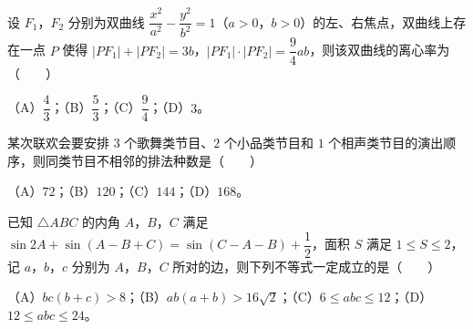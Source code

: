 \begin{question}
设 $F_1$，$F_2$ 分别为双曲线 $\dfrac{x^2}{a^2}-\dfrac{y^2}{b^2}=1$（$a>0$，$b>0$）的左、右焦点，双曲线上存在一点 $P$ 使得 $|PF_1|+|PF_2|=3b$，$|PF_1|\cdot|PF_2|=\dfrac94 ab$，则该双曲线的离心率为\mbox{（　　）}

（A）$\dfrac43$；（B）$\dfrac53$；（C）$\dfrac94$；（D）$3$。

\end{question}
\begin{question}
某次联欢会要安排 $3$ 个歌舞类节目、$2$ 个小品类节目和 $1$ 个相声类节目的演出顺序，则同类节目不相邻的排法种数是\mbox{（　　）}

（A）$72$；（B）$120$；（C）$144$；（D）$168$。

\end{question}
\begin{question}
已知 $\triangle ABC$ 的内角 $A$，$B$，$C$ 满足 $\sin 2A+\sin(A-B+C)=\sin(C-A-B)+\dfrac12$，面积 $S$ 满足 $1\leqslant S\leqslant 2$，记 $a$，$b$，$c$ 分别为 $A$，$B$，$C$ 所对的边，则下列不等式一定成立的是\mbox{（　　）}

（A）$bc(b+c)>8$；（B）$ab(a+b)>16\sqrt2$；（C）$6\leqslant abc\leqslant 12$；（D）$12\leqslant abc\leqslant 24$。

\end{question}

